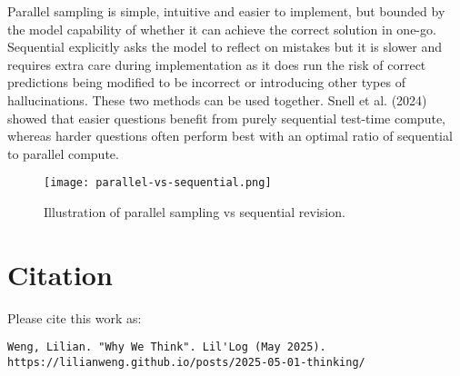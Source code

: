 \documentclass[12pt]{article}
\begin{document}
Parallel sampling is simple, intuitive and easier to implement, but bounded by the model capability of whether it can achieve the correct solution in one-go. Sequential explicitly asks the model to reflect on mistakes but it is slower and requires extra care during implementation as it does run the risk of correct predictions being modified to be incorrect or introducing other types of hallucinations. These two methods can be used together. Snell et al. (2024) showed that easier questions benefit from purely sequential test-time compute, whereas harder questions often perform best with an optimal ratio of sequential to parallel compute.

\begin{figure}[h]
    \centering
    \texttt{[image: parallel-vs-sequential.png]}
    \caption{Illustration of parallel sampling vs sequential revision.}
\end{figure}




\section{Citation}

Please cite this work as:

\begin{verbatim}
Weng, Lilian. "Why We Think". Lil'Log (May 2025). https://lilianweng.github.io/posts/2025-05-01-thinking/
\end{verbatim}
\end{document}
